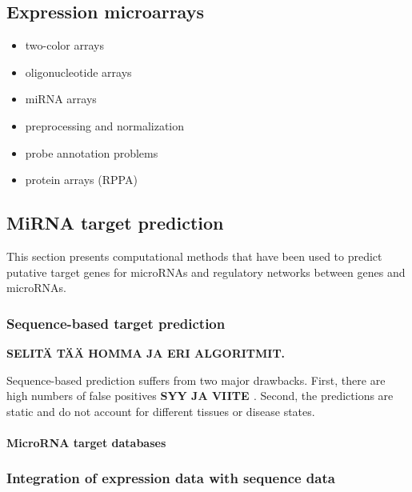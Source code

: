\subsection{Expression microarrays}

\begin{itemize}
  \item two-color arrays
  \item oligonucleotide arrays
  \item miRNA arrays
  \item preprocessing and normalization
  \item probe annotation problems
  \item protein arrays (RPPA)
\end{itemize}









\subsection{MiRNA target prediction}\label{mirna-target-prediction}

This section presents computational methods that have been used to predict
putative target genes for microRNAs and regulatory networks between genes and
microRNAs.





\subsubsection{Sequence-based target prediction}\label{sequence-based-target-
prediction}

\textbf{SELITÄ TÄÄ HOMMA JA ERI ALGORITMIT.}

Sequence-based prediction suffers from two major drawbacks. First, there are
high numbers of false positives \textbf{SYY JA VIITE
\citep{Sethupathy2006?}}. Second, the predictions are static and do not
account for different tissues or disease states.


\paragraph{MicroRNA target databases}





\subsubsection{Integration of expression data with sequence data}\label
{integration-of-expression-data-with-sequence-data}

